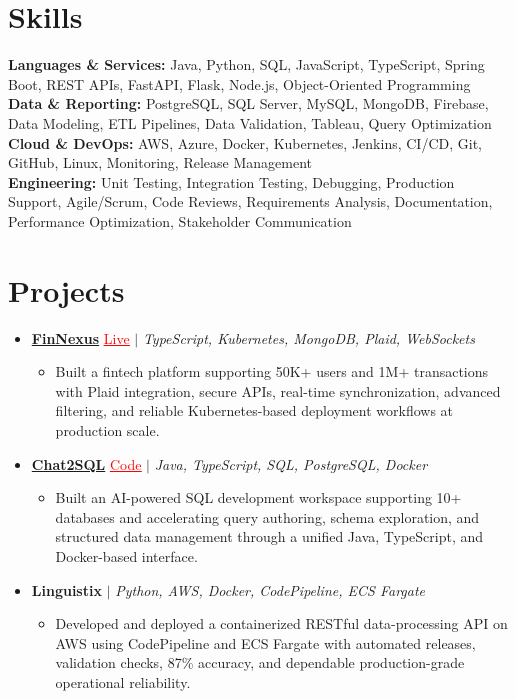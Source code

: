 \documentclass[letterpaper,10pt]{article}
\newcommand{\itemTail}{\vspace{-5pt}}
\newcommand{\sectionGap}{\vspace{-8pt}}
\newcommand{\projGap}{\vspace{3pt}}
\newcommand{\resumeItem}[1]{\item\small{{#1 \itemTail}}}
\newcommand{\resumeProjectHeading}[1]{\item \small #1 \vspace{-2pt}}
\newcommand{\resumeProjectLink}[2]{\href{#1}{\textcolor{red}{\underline{#2}}}}
\newcommand{\resumeSubHeadingListStart}{\begin{itemize}[leftmargin=0.0in, label={}]}
\newcommand{\resumeSubHeadingListEnd}{\end{itemize}}
\newcommand{\resumeProjItemListStart}{\begin{itemize}[leftmargin=0.15in,label=\textbullet,itemsep=3pt,topsep=0pt,parsep=0pt,partopsep=0pt]}
\newcommand{\resumeProjItemListEnd}{\end{itemize}\vspace{-4pt}}
\begin{document}
\section{Skills}
\begin{itemize}[leftmargin=0.15in, label={}]
\small{\item{
\textbf{Languages \& Services:} Java, Python, SQL, JavaScript, TypeScript, Spring Boot, REST APIs, FastAPI, Flask, Node.js, Object-Oriented Programming \\
\textbf{Data \& Reporting:} PostgreSQL, SQL Server, MySQL, MongoDB, Firebase, Data Modeling, ETL Pipelines, Data Validation, Tableau, Query Optimization \\
\textbf{Cloud \& DevOps:} AWS, Azure, Docker, Kubernetes, Jenkins, CI/CD, Git, GitHub, Linux, Monitoring, Release Management \\
\textbf{Engineering:} Unit Testing, Integration Testing, Debugging, Production Support, Agile/Scrum, Code Reviews, Requirements Analysis, Documentation, Performance Optimization, Stakeholder Communication
}}
\end{itemize}
\sectionGap
\section{Projects}
\resumeSubHeadingListStart
\vspace{-2pt}
\resumeProjectHeading{\href{https://fin-nexus.vercel.app/}{\textbf{FinNexus}} \resumeProjectLink{https://fin-nexus.vercel.app/}{Live} $|$ \emph{TypeScript, Kubernetes, MongoDB, Plaid, WebSockets}}
\resumeProjItemListStart
\resumeItem{Built a fintech platform supporting 50K+ users and 1M+ transactions with Plaid integration, secure APIs, real-time synchronization, advanced filtering, and reliable Kubernetes-based deployment workflows at production scale.}
\resumeProjItemListEnd
\projGap
\resumeProjectHeading{\href{https://github.com/SAHAJ-BHADJA/Chat2SQL}{\textbf{Chat2SQL}} \resumeProjectLink{https://github.com/SAHAJ-BHADJA/Chat2SQL}{Code} $|$ \emph{Java, TypeScript, SQL, PostgreSQL, Docker}}
\resumeProjItemListStart
\resumeItem{Built an AI-powered SQL development workspace supporting 10+ databases and accelerating query authoring, schema exploration, and structured data management through a unified Java, TypeScript, and Docker-based interface.}
\resumeProjItemListEnd
\projGap
\resumeProjectHeading{\textbf{Linguistix} $|$ \emph{Python, AWS, Docker, CodePipeline, ECS Fargate}}
\resumeProjItemListStart
\resumeItem{Developed and deployed a containerized RESTful data-processing API on AWS using CodePipeline and ECS Fargate with automated releases, validation checks, 87\% accuracy, and dependable production-grade operational reliability.}
\resumeProjItemListEnd
\resumeSubHeadingListEnd
\end{document}
